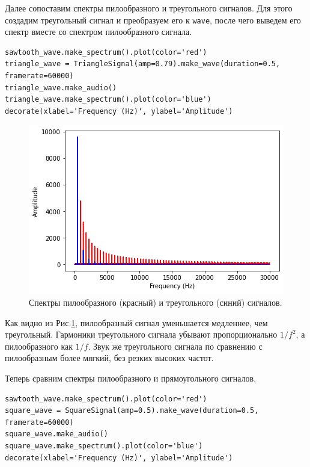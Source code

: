 \documentclass[a4paper, 14pt]{extarticle}
\begin{document}
    Далее сопоставим спектры пилообразного и треугольного сигналов.
    Для этого создадим треугольный сигнал и преобразуем его к \texttt{wave}, после чего выведем его спектр вместе со спектром пилообразного сигнала.

    \begin{lstlisting}[caption= Вывод спектров треугольного и пилообразного сигналов., label={lst:task2_spectrum_sawtooth_triangle}]
sawtooth_wave.make_spectrum().plot(color='red')
triangle_wave = TriangleSignal(amp=0.79).make_wave(duration=0.5, framerate=60000)
triangle_wave.make_audio()
triangle_wave.make_spectrum().plot(color='blue')
decorate(xlabel='Frequency (Hz)', ylabel='Amplitude')
    \end{lstlisting}

    \begin{figure}[h]
        \centering
        \includegraphics[width=0.8\linewidth]{resources/Images/task2_spectrum_sawtooth_triangle}
        \caption{Спектры пилообразного (красный) и треугольного (синий) сигналов.}
        \label{fig:task2_spectrum_sawtooth_triangle}
    \end{figure}

    Как видно из Рис.\ref{fig:task2_spectrum_sawtooth_triangle}, пилообразный сигнал уменьшается медленнее, чем треугольный.
    Гармоники треугольного сигнала убывают пропорционально $1/f^2$, а пилообразного как $1/f$.
    Звук же треугольного сигнала по сравнению с пилообразным более мягкий, без резких высоких частот.

    Теперь сравним спектры пилообразного и прямоугольного сигналов.

    \begin{lstlisting}[caption= Вывод спектров прямоугольного и пилообразного сигналов., label={lst:task2_spectrum_sawtooth_square}]
sawtooth_wave.make_spectrum().plot(color='red')
square_wave = SquareSignal(amp=0.5).make_wave(duration=0.5, framerate=60000)
square_wave.make_audio()
square_wave.make_spectrum().plot(color='blue')
decorate(xlabel='Frequency (Hz)', ylabel='Amplitude')
    \end{lstlisting}
\end{document}
